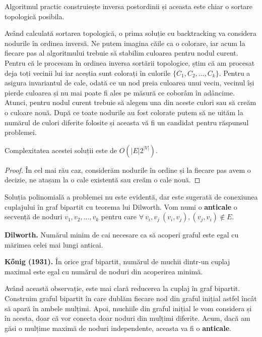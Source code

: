 Algoritmul practic construiește inversa postordinii și aceasta este chiar o sortare topologică posibila.

Având calculată sortarea topologică, o prima soluție cu backtracking va considera nodurile în ordinea inversă.
Ne putem imagina căile ca o colorare, iar acum la fiecare pas al algoritmului trebuie să stabilim culoarea pentru
nodul curent. Pentru că le procesam în ordinea inversa sortării topologice, știm că am procesat deja toți vecinii lui
iar aceștia sunt colorați în culorile $\{C_{1}, C_{2}, \ldots, C_{k}\}$. Pentru a asigura invariantul de cale, odată ce
un nod preia culoarea unui vecin, vecinul își pierde culoarea și nu mai poate fi ales pe măsură ce coborâm în adâncime.
Atunci, pentru nodul curent trebuie să alegem una din aceste culori sau să creăm o culoare nouă. După ce toate nodurile
au fost colorate putem să ne uităm la numărul de culori diferite folosite și aceasta vă fi un candidat pentru răspunsul
problemei.

\begin{lem}
  Complexitatea acestei soluții este de $O(|E|2^{|V|})$.
\end{lem}

\begin{proof}
  În cel mai rău caz, considerăm nodurile în ordine și la fiecare pas avem o decizie, ne atașam la o cale existentă sau creăm o cale
  nouă.
\end{proof}

\noindent Soluția polinomială a problemei nu este evidentă, dar este sugerată de conexiunea cuplajului în graf bipartit cu teorema lui
Dilworth. Vom numi o \textbf{anticale} o secvență de noduri $v_{1}, v_{2}, \ldots, v_{k}$ pentru care
$\forall \ v_{i}, v_{j} \ (v_{i}, v_{j}), (v_{j}, v_{i}) \notin E$.

\begin{thm}
  \label{Dilworth}
  \textbf{Dilworth.} Numărul minim de cai necesare ca să acoperi graful este egal cu mărimea celei mai lungi anticai.
\end{thm}

\begin{thm}
  \label{Konig}
  \textbf{Kőnig (1931).} În orice graf bipartit, numărul de muchii dintr-un cuplaj maximal este egal cu numărul de noduri din acoperirea minimă.
\end{thm}

Având această observație, este mai clară reducerea la cuplaj în graf bipartit. Construim graful bipartit în care dublăm fiecare nod din graful
inițial astfel încât să apară în ambele mulțimi. Apoi, muchiile din graful inițial le vom considera și în acesta, doar că vor conecta doar
noduri din mulțimi diferite. Acum, dacă am găsi o mulțime maximă de noduri independente, aceasta va fi o \textbf{anticale}.

